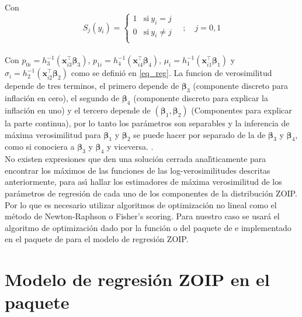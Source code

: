 Con
\[
S_j(y_i)=
\begin{cases}
1 & \text{si}\ y_i=j\\
0 & \text{si}\ y_i\neq j\\
\end{cases}
\quad ; \quad j=0,1
\]
\\
Con $p_{0i}=h_3^{-1}(\mathbf{x}_{i3}^{\top} \boldsymbol{\beta}_3)$, $p_{1i}=h_4^{-1}(\mathbf{x}_{i4}^{\top} \boldsymbol{\beta}_4)$, $\mu_i=h_1^{-1}(\mathbf{x}_{i1}^{\top} \boldsymbol{\beta}_1)$ y $\sigma_i=h_2^{-1}(\mathbf{x}_{i2}^{\top} \boldsymbol{\beta}_2)$ como se defini\'{o} en \eqref{eq_reg}. La funcion de verosimilitud depende de tres terminos, el primero depende de $\boldsymbol{\beta}_3$ (componente discreto para inflaci\'{o}n en cero), el segundo de $\boldsymbol{\beta}_4$ (componente discreto para explicar la inflaci\'{o}n en uno) y el tercero depende de $(\boldsymbol{\beta}_1,\boldsymbol{\beta}_2)$ (Componentes para explicar la parte continua), por lo tanto los par\'{a}metros son separables y la inferencia de m\'{a}xima verosimilitud para $\boldsymbol{\beta}_1$ y $\boldsymbol{\beta}_2$ se puede hacer por separado de la de $\boldsymbol{\beta}_3$ y $\boldsymbol{\beta}_4$, como si conociera a $\boldsymbol{\beta}_3$ y $\boldsymbol{\beta}_4$ y viceversa. \citep{Ospina1}.\\

No existen expresiones que den una soluci\'{o}n cerrada anal\'{\i}ticamente para encontrar los m\'{a}ximos de las funciones de las log-verosimilitudes descritas anteriormente, para as\'{\i} hallar los estimadores de m\'{a}xima verosimilitud de los par\'{a}metros de regresi\'{o}n de cada uno de los componentes de la distribuci\'{o}n ZOIP. Por lo que es necesario utilizar algoritmos de optimizaci\'{o}n no lineal como el m\'{e}todo de Newton-Raphson o Fisher's scoring. Para nuestro caso se usar\'{a} el algoritmo de optimizaci\'{o}n dado por la funci\'{o}n  o  del paquete  de  e implementado en el paquete  de  para el modelo de regresi\'{o}n ZOIP.


\section{Modelo de regresi\'{o}n ZOIP en el paquete }

